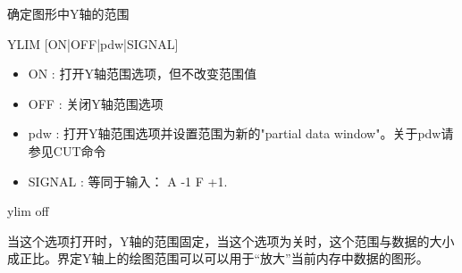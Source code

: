 \label{cmd:ylim}

确定图形中Y轴的范围

\begin{SACSTX}
YLIM [ON|OFF|pdw|SIGNAL]
\end{SACSTX}

\begin{itemize}
\item ON : 打开Y轴范围选项，但不改变范围值 
\item OFF : 关闭Y轴范围选项 
\item pdw : 打开Y轴范围选项并设置范围为新的"partial data window"。关于pdw请参见CUT命令 
\item SIGNAL : 等同于输入： A -1 F +1. 
\end{itemize}

\begin{SACDFT}
ylim off
\end{SACDFT}

当这个选项打开时，Y轴的范围固定，当这个选项为关时，这个范围与数据的大小成正比。界定Y轴上的绘图范围可以可以用于``放大''当前内存中数据的图形。

